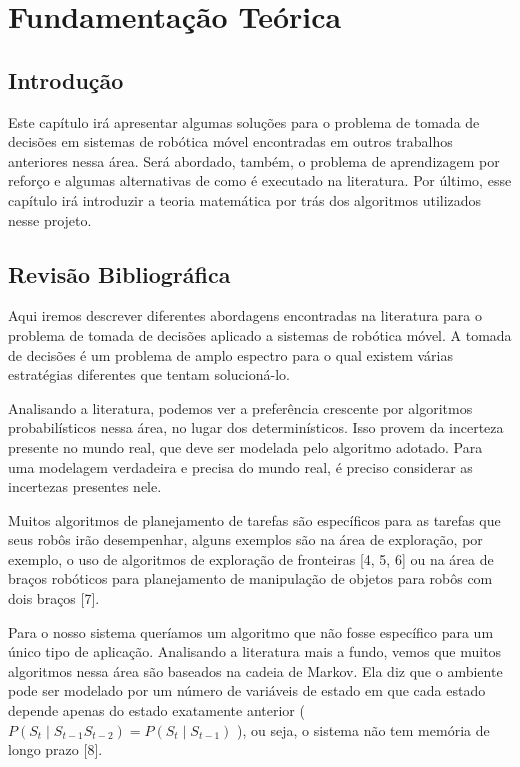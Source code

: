 
\chapter{Fundamentação Teórica\label{chap:FundamentacaoMatematica}}



\section{Introdução}

Este capítulo irá apresentar algumas soluções para o problema de tomada de decisões em sistemas de robótica móvel encontradas em outros trabalhos anteriores nessa área. Será abordado, também, o problema de aprendizagem por reforço e algumas alternativas de como é executado na literatura. Por último, esse capítulo irá introduzir a teoria matemática por trás dos algoritmos utilizados nesse projeto.


\section{Revisão Bibliográfica}

Aqui iremos descrever diferentes abordagens encontradas na literatura para o problema de tomada de decisões aplicado a sistemas de robótica móvel. A tomada de decisões é um problema de amplo espectro para o qual existem várias estratégias diferentes que tentam solucioná-lo.

Analisando a literatura, podemos ver a preferência crescente por algoritmos probabilísticos nessa área, no lugar dos determinísticos. Isso provem da incerteza presente no mundo real, que deve ser modelada pelo algoritmo adotado. Para uma modelagem verdadeira e precisa do mundo real, é preciso considerar as incertezas presentes nele.

Muitos algoritmos de planejamento de tarefas são específicos para as tarefas que seus robôs irão desempenhar, alguns exemplos são na área de exploração, por exemplo, o uso de algoritmos de exploração de fronteiras [4, 5, 6] ou na área de braços robóticos para planejamento de manipulação de objetos para robôs com dois braços [7].

Para o nosso sistema queríamos um algoritmo que não fosse específico para um único tipo de aplicação. Analisando a literatura mais a fundo, vemos que muitos algoritmos nessa área são baseados na cadeia de Markov. Ela diz que o ambiente pode ser modelado por um número de variáveis de estado em que cada estado depende apenas do estado exatamente anterior ( $ P(S_t\mid S_{t-1}S_{t-2})=P(S_t\mid S_{t-1}) $ ), ou seja, o sistema não tem memória de longo prazo [8].

